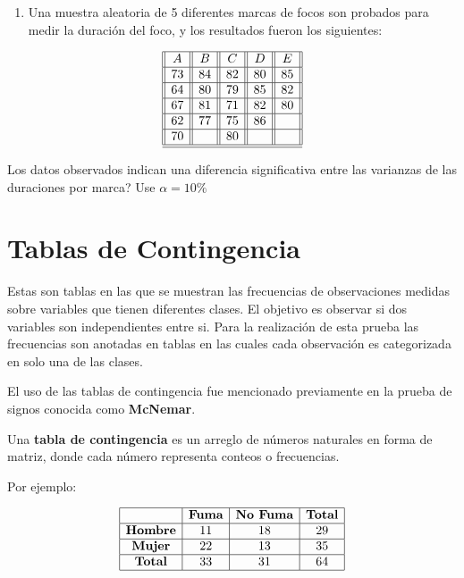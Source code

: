 \documentclass[
  a4paper,
  oneside,
  openany]{book}
\providecommand{\tightlist}{%
  \setlength{\itemsep}{0pt}\setlength{\parskip}{0pt}}
\begin{document}
\begin{enumerate}
\def\labelenumi{\arabic{enumi}.}
\tightlist
\item
  Una muestra aleatoria de 5 diferentes marcas de focos son probados para medir la duración del foco, y los resultados fueron los siguientes:
\end{enumerate}

\[
\begin{array}{||c| |c| |c| |c||c||} 
\hline 
A & B&C&D&E \\ 
 \hline
73&84&82&80&85\\
 \hline
64&80&79&85&82\\
 \hline
67&81&71&82&80\\
 \hline
62&77&75&86&\\
 \hline
70&&80&&\\
\hline
\hline
\end{array}
\]

Los datos observados indican una diferencia significativa entre las varianzas de las duraciones por marca? Use \(\alpha=10\%\)

\hypertarget{tablas-de-contingencia}{%
\chapter*{Tablas de Contingencia}\label{tablas-de-contingencia}}


Estas son tablas en las que se muestran las frecuencias de observaciones medidas sobre variables que tienen diferentes clases. El objetivo es observar si dos variables son independientes entre si. Para la realización de esta prueba las frecuencias son anotadas en tablas en las cuales cada observación es categorizada en solo una de las clases.

El uso de las tablas de contingencia fue mencionado previamente en la prueba de signos conocida como \textbf{McNemar}.

Una \textbf{tabla de contingencia} es un arreglo de números naturales en forma de matriz, donde cada número representa conteos o frecuencias.

Por ejemplo:

\[
\begin{array}{|c|c|c|c|} 
\hline
&\textbf{Fuma} &\textbf{No Fuma} &\textbf{Total}\\
\hline
\textbf{Hombre} &11 &18 &29\\
\hline
\textbf{Mujer} &22 &13 &35\\
\hline
\textbf{Total}& 33& 31 &64\\
\hline
\end{array}
\]
\end{document}
